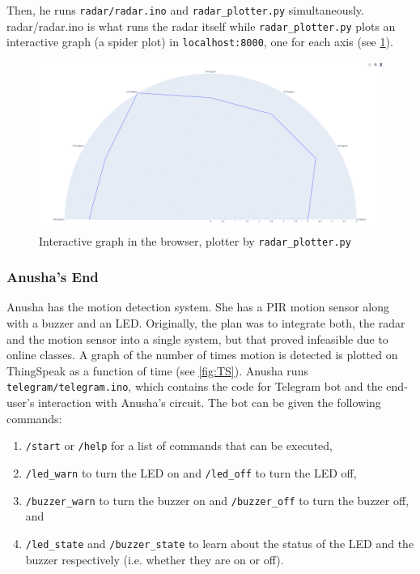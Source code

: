 \documentclass[12pt, a4paper]{article}
\theoremstyle{definition}
\theoremstyle{remark}
\begin{document}
Then, he runs \texttt{radar/radar.ino} and \texttt{radar\_plotter.py} simultaneously. \ttfamily radar/\allowbreak radar.ino \normalfont is what runs the radar itself while \texttt{radar\_plotter.py} plots an interactive graph (a spider plot) in \texttt{localhost:8000}, one for each axis (see \cref{fig:RP}).

\begin{figure}[!h]
    \centering
    \includegraphics[scale=0.15]{img/RadarPlotter Chart.png}
    \caption{Interactive graph in the browser, plotter by \texttt{radar\_plotter.py}}
    \label{fig:RP}
\end{figure}

\subsubsection*{Anusha's End}
Anusha has the motion detection system. She has a PIR motion sensor along with a buzzer and an LED. Originally, the plan was to integrate both, the radar and the motion sensor into a single system, but that proved infeasible due to online classes. A graph of the number of times motion is detected is plotted on ThingSpeak as a function of time (see \cref{fig:TS}). Anusha runs \texttt{telegram/\allowbreak telegram.ino}, which contains the code for Telegram bot and the end-user's interaction with Anusha's circuit. The bot can be given the following commands:
\begin{enumerate}
    \item \texttt{/start} or \texttt{/help} for a list of commands that can be executed,
    \item \texttt{/led\_warn} to turn the LED on and \texttt{/led\_off} to turn the LED off,
    \item \texttt{/buzzer\_warn} to turn the buzzer on and \texttt{/buzzer\_off} to turn the buzzer off, and
    \item \texttt{/led\_state} and \texttt{/buzzer\_state} to learn about the status of the LED and the buzzer respectively (i.e. whether they are on or off).
\end{enumerate}
\end{document}
